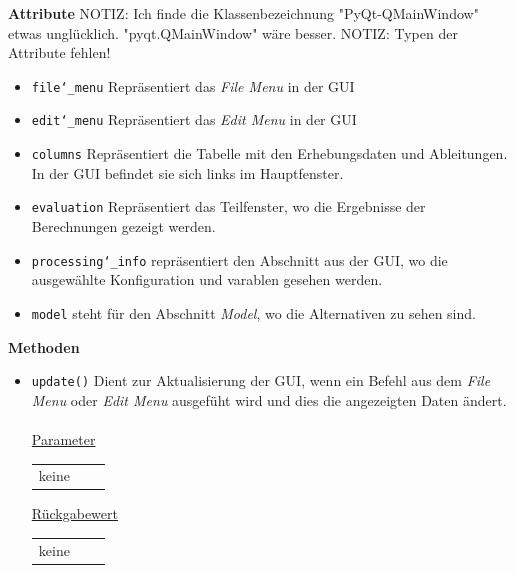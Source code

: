 \documentclass{article}
\begin{document}
\textbf{{Attribute}}
NOTIZ: Ich finde die Klassenbezeichnung "PyQt-QMainWindow" etwas unglücklich. "pyqt.QMainWindow" wäre besser.
NOTIZ: Typen der Attribute fehlen!
\begin{itemize}
\item \texttt{file\char`_menu} \newline Repräsentiert das \textit{File Menu} in der GUI
\item \texttt{edit\char`_menu} \newline Repräsentiert das \textit{Edit Menu} in der GUI
\item \texttt{columns} \newline Repräsentiert die Tabelle mit den Erhebungsdaten und Ableitungen. In der GUI befindet sie sich links im Hauptfenster.
\item \texttt{evaluation} \newline Repräsentiert das Teilfenster, wo die Ergebnisse der Berechnungen gezeigt werden.
\item \texttt{processing\char`_info} \newline repräsentiert den Abschnitt aus der GUI, wo die ausgewählte Konfiguration und varablen gesehen werden.
\item \texttt{model} \newline steht für den Abschnitt \textit{Model}, wo die Alternativen zu sehen sind.
\end{itemize}

\textbf{{Methoden}}
\begin{itemize}
\item \texttt{update()} \newline Dient zur Aktualisierung der GUI, wenn ein Befehl aus dem \textit{File Menu} oder \textit{Edit Menu} ausgefüht wird und dies die angezeigten Daten ändert.
\\\\
\underline{{Parameter}}
\begin{tabular}{lll}
 keine \\
\end{tabular}

\underline{{Rückgabewert}}
\begin{tabular}{lll}
 keine \\
\end{tabular}
\end{itemize}
\end{document}
